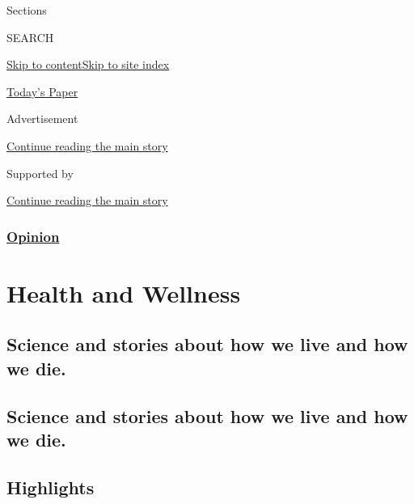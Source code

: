 Sections

SEARCH

\protect\hyperlink{site-content}{Skip to
content}\protect\hyperlink{site-index}{Skip to site index}

\href{https://myaccount.nytimes3xbfgragh.onion/auth/login?response_type=cookie\&client_id=vi}{}

\href{https://www.nytimes3xbfgragh.onion/section/todayspaper}{Today's
Paper}

Advertisement

\protect\hyperlink{after-top}{Continue reading the main story}

Supported by

\protect\hyperlink{after-sponsor}{Continue reading the main story}

\hypertarget{opinion}{%
\subsubsection{\texorpdfstring{\href{/section/opinion}{Opinion}}{Opinion}}\label{opinion}}

\hypertarget{health-and-wellness}{%
\section{Health and Wellness}\label{health-and-wellness}}

\hypertarget{science-and-stories-about-how-we-live-and-how-we-die}{%
\subsection{Science and stories about how we live and how we
die.}\label{science-and-stories-about-how-we-live-and-how-we-die}}

\hypertarget{science-and-stories-about-how-we-live-and-how-we-die-1}{%
\subsection{Science and stories about how we live and how we
die.}\label{science-and-stories-about-how-we-live-and-how-we-die-1}}

\hypertarget{highlights}{%
\subsection{Highlights}\label{highlights}}


